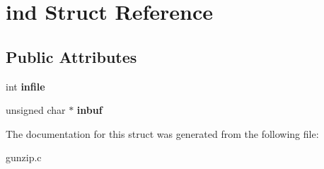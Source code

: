 \hypertarget{structind}{
\section{ind Struct Reference}
\label{structind}
}
\subsection*{Public Attributes}
\begin{DoxyCompactItemize}
\item 
\hypertarget{structind_af2f798c95f438a3718632db7d21e219a}{
int {\bfseries infile}}
\label{structind_af2f798c95f438a3718632db7d21e219a}

\item 
\hypertarget{structind_ad078e2401b1613717ee6f13610bb2d68}{
unsigned char $\ast$ {\bfseries inbuf}}
\label{structind_ad078e2401b1613717ee6f13610bb2d68}

\end{DoxyCompactItemize}


The documentation for this struct was generated from the following file:\begin{DoxyCompactItemize}
\item 
gunzip.c\end{DoxyCompactItemize}
